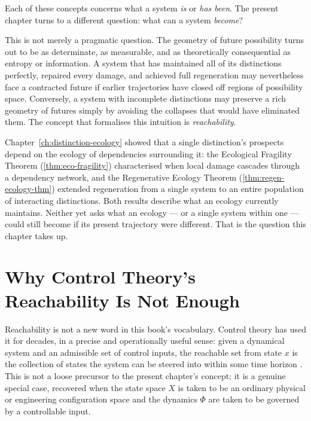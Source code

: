 \documentclass[12pt,twoside,openright]{book}
\begin{document}
Each of these concepts concerns what a system \emph{is} or
\emph{has been}. The present chapter turns to a different
question: what can a system \emph{become}?

This is not merely a pragmatic question. The geometry of
future possibility turns out to be as determinate, as
measurable, and as theoretically consequential as entropy
or information. A system that has maintained all of its
distinctions perfectly, repaired every damage, and achieved
full regeneration may nevertheless face a contracted future
if earlier trajectories have closed off regions of
possibility space. Conversely, a system with incomplete
distinctions may preserve a rich geometry of futures simply
by avoiding the collapses that would have eliminated them.
The concept that formalises this intuition is
\emph{reachability}.

Chapter~\ref{ch:distinction-ecology} showed that a single
distinction's prospects depend on the ecology of dependencies
surrounding it: the Ecological Fragility Theorem
(\cref{thm:eco-fragility}) characterised when local damage
cascades through a dependency network, and the Regenerative
Ecology Theorem (\cref{thm:regen-ecology-thm}) extended
regeneration from a single system to an entire population of
interacting distinctions. Both results describe what an
ecology currently maintains. Neither yet asks what an ecology
--- or a single system within one --- could still become if
its present trajectory were different. That is the question
this chapter takes up.

\section{Why Control Theory's Reachability Is Not Enough}
\label{sec:ch13-why-control-theory}

Reachability is not a new word in this book's vocabulary.
Control theory has used it for decades, in a precise and
operationally useful sense: given a dynamical system and an
admissible set of control inputs, the reachable set from
state $x$ is the collection of states the system can be
steered into within some time horizon
\parencite{kalman1960,sontag1998}. This is not a loose
precursor to the present chapter's concept; it is a genuine
special case, recovered when the state space $X$ is taken to
be an ordinary physical or engineering configuration space
and the dynamics $\Phi$ are taken to be governed by a
controllable input.
\end{document}
